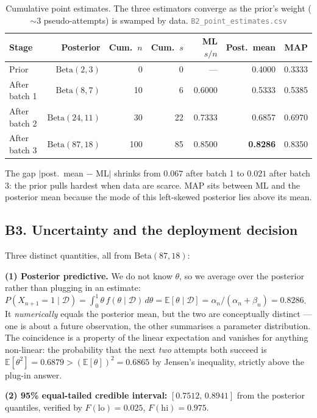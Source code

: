 \documentclass[10pt,a4paper]{article}
\newcommand{\D}{\mathcal{D}}
\begin{document}
\begin{table}[H]\centering\small
\caption{Cumulative point estimates. The three estimators converge as the prior's weight (${\sim}3$
pseudo-attempts) is swamped by data. \textcolor{gray}{\small\texttt{B2\_point\_estimates.csv}}}
\label{tab:Bpoint}
\begin{tabular}{lrrrrrr}
\toprule
Stage & Posterior & Cum.\ $n$ & Cum.\ $s$ & ML $s/n$ & Post.\ mean & MAP \\
\midrule
Prior & $\mathrm{Beta}(2,3)$ & 0 & 0 & --- & 0.4000 & 0.3333 \\
After batch 1 & $\mathrm{Beta}(8,7)$ & 10 & 6 & 0.6000 & 0.5333 & 0.5385 \\
After batch 2 & $\mathrm{Beta}(24,11)$ & 30 & 22 & 0.7333 & 0.6857 & 0.6970 \\
After batch 3 & $\mathrm{Beta}(87,18)$ & 100 & 85 & 0.8500 & \textbf{0.8286} & 0.8350 \\
\bottomrule
\end{tabular}
\end{table}

The gap $|$post.\ mean $-$ ML$|$ shrinks from $0.067$ after batch 1 to $0.021$ after batch 3: the
prior pulls hardest when data are scarce. MAP sits between ML and the posterior mean because the mode
of this left-skewed posterior lies above its mean.

\subsection{B3. Uncertainty and the deployment decision}

Three distinct quantities, all from $\mathrm{Beta}(87,18)$:

\textbf{(1) Posterior predictive.} We do not know $\theta$, so we average over the posterior rather
than plugging in an estimate:
$P(X_{n+1}{=}1\mid\D)=\int_0^1\theta\,f(\theta\mid\D)\,d\theta=\mathbb{E}[\theta\mid\D]=\alpha_n/(\alpha_n{+}\beta_n)=\mathbf{0.8286}$.
It \emph{numerically} equals the posterior mean, but the two are conceptually distinct --- one is
about a future observation, the other summarises a parameter distribution. The coincidence is a
property of the linear expectation and vanishes for anything non-linear: the probability that the next
\emph{two} attempts both succeed is $\mathbb{E}[\theta^2]=0.6879 > (\mathbb{E}[\theta])^2=0.6865$ by
Jensen's inequality, strictly above the plug-in answer.

\textbf{(2) 95\% equal-tailed credible interval:} $[\mathbf{0.7512},\,\mathbf{0.8941}]$ from the
posterior quantiles, verified by $F(\text{lo})=0.025$, $F(\text{hi})=0.975$.
\end{document}
